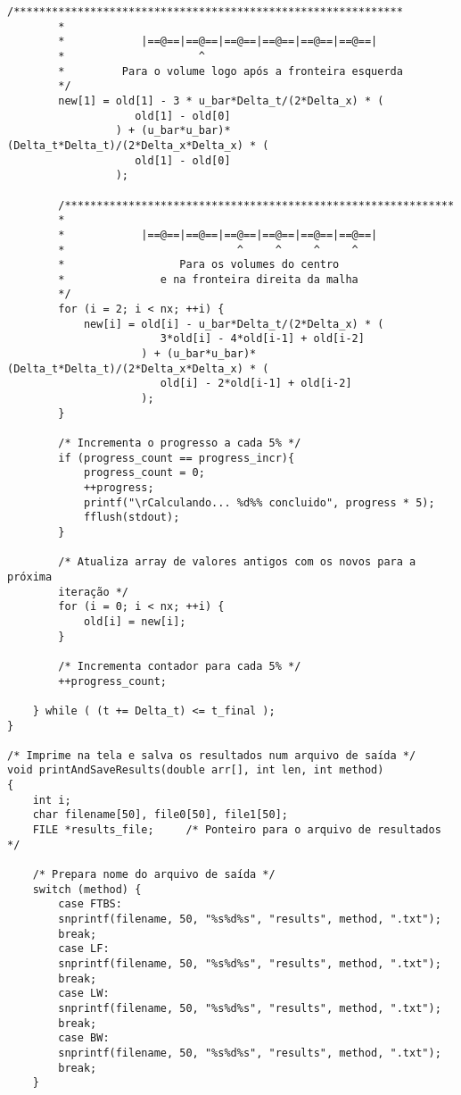 \begin{Verbatim}[fontsize=\footnotesize]
        /*************************************************************
        *
        *            |==@==|==@==|==@==|==@==|==@==|==@==|
        *                     ^
        *         Para o volume logo após a fronteira esquerda
        */
        new[1] = old[1] - 3 * u_bar*Delta_t/(2*Delta_x) * (
                    old[1] - old[0]
                 ) + (u_bar*u_bar)*(Delta_t*Delta_t)/(2*Delta_x*Delta_x) * (
                    old[1] - old[0]
                 );

        /*************************************************************
        *
        *            |==@==|==@==|==@==|==@==|==@==|==@==|
        *                           ^     ^     ^     ^
        *                  Para os volumes do centro
        *               e na fronteira direita da malha
        */
        for (i = 2; i < nx; ++i) {
            new[i] = old[i] - u_bar*Delta_t/(2*Delta_x) * (
                        3*old[i] - 4*old[i-1] + old[i-2]
                     ) + (u_bar*u_bar)*(Delta_t*Delta_t)/(2*Delta_x*Delta_x) * (
                        old[i] - 2*old[i-1] + old[i-2]
                     );
        }

        /* Incrementa o progresso a cada 5% */
        if (progress_count == progress_incr){
            progress_count = 0;
            ++progress;
            printf("\rCalculando... %d%% concluido", progress * 5);
            fflush(stdout);
        }

        /* Atualiza array de valores antigos com os novos para a próxima
        iteração */
        for (i = 0; i < nx; ++i) {
            old[i] = new[i];
        }

        /* Incrementa contador para cada 5% */
        ++progress_count;

    } while ( (t += Delta_t) <= t_final );
}

/* Imprime na tela e salva os resultados num arquivo de saída */
void printAndSaveResults(double arr[], int len, int method)
{
    int i;
    char filename[50], file0[50], file1[50];
    FILE *results_file;     /* Ponteiro para o arquivo de resultados */

    /* Prepara nome do arquivo de saída */
    switch (method) {
        case FTBS:
        snprintf(filename, 50, "%s%d%s", "results", method, ".txt");
        break;
        case LF:
        snprintf(filename, 50, "%s%d%s", "results", method, ".txt");
        break;
        case LW:
        snprintf(filename, 50, "%s%d%s", "results", method, ".txt");
        break;
        case BW:
        snprintf(filename, 50, "%s%d%s", "results", method, ".txt");
        break;
    }


\end{Verbatim}
